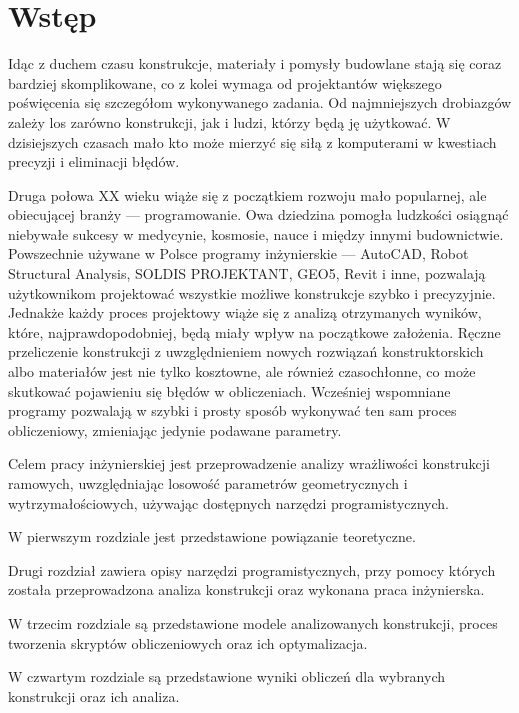 \newpage
{}
\section*{Wstęp}

Idąc z duchem czasu konstrukcje, materiały i pomysły budowlane stają się coraz bardziej skomplikowane, co z kolei wymaga
od projektantów większego poświęcenia się szczegółom wykonywanego zadania. Od najmniejszych drobiazgów zależy los
zarówno konstrukcji, jak i ludzi, którzy będą ję użytkować. W dzisiejszych czasach mało kto może mierzyć się siłą z
komputerami w kwestiach precyzji i eliminacji błędów.

\par Druga połowa XX wieku wiąże się z początkiem rozwoju mało popularnej, ale obiecującej branży — programowanie.
Owa dziedzina pomogła ludzkości osiągnąć niebywałe sukcesy w medycynie, kosmosie, nauce i między innymi budownictwie.
Powszechnie używane w Polsce programy inżynierskie — AutoCAD, Robot Structural Analysis, SOLDIS PROJEKTANT, GEO5, Revit i inne,
pozwalają użytkownikom projektować wszystkie możliwe konstrukcje szybko i precyzyjnie. Jednakże każdy proces projektowy wiąże się z
analizą otrzymanych wyników, które, najprawdopodobniej, będą miały wpływ na początkowe założenia. Ręczne przeliczenie konstrukcji z
uwzględnieniem nowych rozwiązań konstruktorskich albo materiałów jest nie tylko kosztowne, ale również czasochłonne, co może skutkować
pojawieniu się błędów w obliczeniach. Wcześniej wspomniane programy pozwalają w szybki i prosty sposób wykonywać ten sam
proces obliczeniowy, zmieniając jedynie podawane parametry.

\par Celem pracy inżynierskiej jest przeprowadzenie analizy wrażliwości konstrukcji ramowych, uwzględniając losowość
parametrów geometrycznych i wytrzymałościowych, używając dostępnych narzędzi programistycznych.

\par W pierwszym rozdziale jest przedstawione powiązanie teoretyczne.

\par Drugi rozdział zawiera opisy narzędzi programistycznych, przy pomocy których została przeprowadzona analiza konstrukcji
oraz wykonana praca inżynierska.

\par W trzecim rozdziale są przedstawione modele analizowanych konstrukcji, proces tworzenia skryptów obliczeniowych oraz
ich optymalizacja.

\par W czwartym rozdziale są przedstawione wyniki obliczeń dla wybranych konstrukcji oraz ich analiza.
